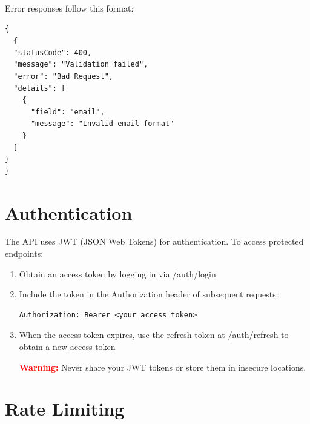 Error responses follow this format:
\begin{tcolorbox}[width=\textwidth, boxrule=0.5pt, colback=gray!5, colframe=gray!50]
\begin{verbatim}
{
  {
  "statusCode": 400,
  "message": "Validation failed",
  "error": "Bad Request",
  "details": [
    {
      "field": "email",
      "message": "Invalid email format"
    }
  ]
}
}
\end{verbatim}
\end{tcolorbox}
\section{Authentication}
The API uses JWT (JSON Web Tokens) for authentication. To access protected endpoints:
\begin{enumerate}
    \item Obtain an access token by logging in via /auth/login
    \item Include the token in the Authorization header of subsequent requests:
    \begin{tcolorbox}[width=\textwidth, boxrule=0.5pt, colback=gray!5, colframe=gray!50]
\begin{verbatim}
Authorization: Bearer <your_access_token>
\end{verbatim}
\end{tcolorbox}
    \item When the access token expires, use the refresh token at /auth/refresh to obtain a new access token
\begin{tcolorbox}[width=\textwidth, boxrule=0.5pt, colback=gray!5, colframe=gray!50]
\small %
\textbf{\textcolor{red}{Warning:}} Never share your JWT tokens or store them in insecure locations.

\end{tcolorbox}
\end{enumerate}
\section{Rate Limiting}

